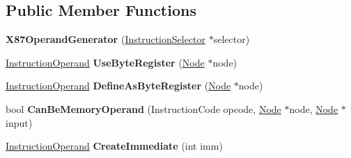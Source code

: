 \subsection*{Public Member Functions}
\begin{DoxyCompactItemize}
\item 
{\bfseries X87\+Operand\+Generator} (\hyperlink{classv8_1_1internal_1_1compiler_1_1_instruction_selector}{Instruction\+Selector} $\ast$selector)\hypertarget{classv8_1_1internal_1_1compiler_1_1_x87_operand_generator_afc5ee1a0be50b660d752ca8427d56d2a}{}\label{classv8_1_1internal_1_1compiler_1_1_x87_operand_generator_afc5ee1a0be50b660d752ca8427d56d2a}

\item 
\hyperlink{classv8_1_1internal_1_1compiler_1_1_instruction_operand}{Instruction\+Operand} {\bfseries Use\+Byte\+Register} (\hyperlink{classv8_1_1internal_1_1compiler_1_1_node}{Node} $\ast$node)\hypertarget{classv8_1_1internal_1_1compiler_1_1_x87_operand_generator_a1ed512dfa2f4c69071b144eefc19329e}{}\label{classv8_1_1internal_1_1compiler_1_1_x87_operand_generator_a1ed512dfa2f4c69071b144eefc19329e}

\item 
\hyperlink{classv8_1_1internal_1_1compiler_1_1_instruction_operand}{Instruction\+Operand} {\bfseries Define\+As\+Byte\+Register} (\hyperlink{classv8_1_1internal_1_1compiler_1_1_node}{Node} $\ast$node)\hypertarget{classv8_1_1internal_1_1compiler_1_1_x87_operand_generator_ab10e2d23b95e232dd6cfe97ec1bd0fbf}{}\label{classv8_1_1internal_1_1compiler_1_1_x87_operand_generator_ab10e2d23b95e232dd6cfe97ec1bd0fbf}

\item 
bool {\bfseries Can\+Be\+Memory\+Operand} (Instruction\+Code opcode, \hyperlink{classv8_1_1internal_1_1compiler_1_1_node}{Node} $\ast$node, \hyperlink{classv8_1_1internal_1_1compiler_1_1_node}{Node} $\ast$input)\hypertarget{classv8_1_1internal_1_1compiler_1_1_x87_operand_generator_a1a73e1455dfddebd049b8292a2d83d29}{}\label{classv8_1_1internal_1_1compiler_1_1_x87_operand_generator_a1a73e1455dfddebd049b8292a2d83d29}

\item 
\hyperlink{classv8_1_1internal_1_1compiler_1_1_instruction_operand}{Instruction\+Operand} {\bfseries Create\+Immediate} (int imm)\hypertarget{classv8_1_1internal_1_1compiler_1_1_x87_operand_generator_a8cc914548261885a225c1a3dd6659fab}{}\label{classv8_1_1internal_1_1compiler_1_1_x87_operand_generator_a8cc914548261885a225c1a3dd6659fab}


\end{DoxyCompactItemize}
